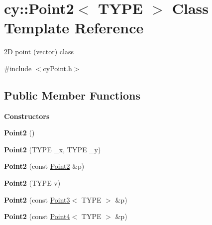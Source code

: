\hypertarget{classcy_1_1_point2}{}\section{cy\+::Point2$<$ T\+Y\+PE $>$ Class Template Reference}
\label{classcy_1_1_point2}


2D point (vector) class  




{\ttfamily \#include $<$cy\+Point.\+h$>$}

\subsection*{Public Member Functions}
\begin{Indent}\textbf{ Constructors}\par
\begin{DoxyCompactItemize}
\item 
\mbox{\label{classcy_1_1_point2_ae55b828e88c06082291be86672ab1ed1}} 
{\bfseries Point2} ()
\item 
\mbox{\label{classcy_1_1_point2_a037059d71f27ada4c890bc08e4e5d86b}} 
{\bfseries Point2} (T\+Y\+PE \+\_\+x, T\+Y\+PE \+\_\+y)
\item 
\mbox{\label{classcy_1_1_point2_a3e3982d4a869df7b6679cd31b8c6c305}} 
{\bfseries Point2} (const \mbox{\hyperlink{classcy_1_1_point2}{Point2}} \&p)
\item 
\mbox{\label{classcy_1_1_point2_a414d861e2ec61689a2d8e6955600fc28}} 
{\bfseries Point2} (T\+Y\+PE v)
\item 
\mbox{\label{classcy_1_1_point2_a25b699807227e709a5eb0fa791440231}} 
{\bfseries Point2} (const \mbox{\hyperlink{classcy_1_1_point3}{Point3}}$<$ T\+Y\+PE $>$ \&p)
\item 
\mbox{\label{classcy_1_1_point2_abea28fe3660f071e736865d9272fd774}} 
{\bfseries Point2} (const \mbox{\hyperlink{classcy_1_1_point4}{Point4}}$<$ T\+Y\+PE $>$ \&p)
\item 
\mbox{\label{classcy_1_1_point2_acbef2fdd20eb09cc50676979cafafb67}} 

\end{DoxyCompactItemize}
\end{Indent}
